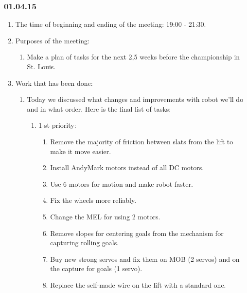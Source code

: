 \subsubsection{01.04.15}
\begin{enumerate}
	
	\item The time of beginning and ending of the meeting: 19:00 - 21:30.
	
	\item Purposes of the meeting: 
	\begin{enumerate}
		
		\item Make a plan of tasks for the next 2,5 weeks before the championship in St. Louis.
		
	\end{enumerate}

	\item Work that has been done:
	\begin{enumerate}
		
		\item Today we discussed what changes and improvements with robot we'll do and in what order. Here is the final list of tasks:
		\begin{enumerate}
			\item 1-st priority:
			\begin{enumerate}
				
				\item Remove the majority of friction between slats from the lift to make it move easier.
				
				\item Install AndyMark motors instead of all DC motors.
				
				\item Use 6 motors for motion and make robot faster.
				
				\item Fix the wheels more reliably.
				
				\item Change the MEL for using 2 motors.
				
				\item Remove slopes for centering goals from the mechanism for capturing rolling goals.
				
				\item Buy new strong servos and fix them on MOB (2 servos) and on the capture for goals (1 servo).
				
				\item Replace the self-made wire on the lift with a standard one.
				

\end{enumerate}
\end{enumerate}
\end{enumerate}
\end{enumerate}
